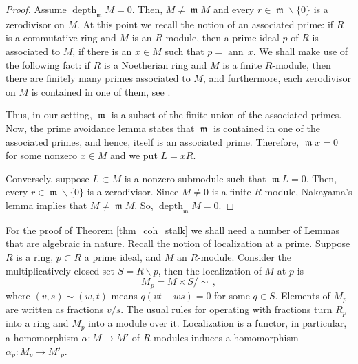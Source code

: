 \documentclass{amsart}
\numberwithin{equation}{section}
\theoremstyle{definition}
\theoremstyle{plain}
\theoremstyle{remark}
\begin{document}
\begin{proof}
Assume ${\mathop{\mathrm{depth}}\nolimits _{{\mathop{\mathfrak{m}}}}} M=0$. Then,  $M\not={{\mathop{\mathfrak{m}}}} M$ and every
 $r\in{{\mathop{\mathfrak{m}}}}\backslash\{0\}$ is a zerodivisor on $M$.
At this point we recall the notion of an associated prime: 
if $R$ is a commutative
ring and $M$ is an $R$-module, then a prime ideal $p$ of $R$ is associated
to $M$, if there is an $x\in M$ such that $p={{\mathop{\mathrm{ann\,}}}} x$.
We shall make use of the following fact:
if $R$ is a Noetherian ring and $M$ is a finite $R$-module, then 
 there are  finitely many primes
associated to $M$, and furthermore, each zerodivisor on $M$ is contained in
one of them, see
\cite[Theorem 3.1]{eisen}.

Thus, in our setting, 
${{\mathop{\mathfrak{m}}}}$ is a subset of the finite union of the associated primes.
Now, the prime avoidance lemma \cite[Theorem 3.3]{eisen} states
that ${{\mathop{\mathfrak{m}}}}$ is contained in one of the associated primes,
and hence, itself 
is an associated prime. Therefore, 
 ${{\mathop{\mathfrak{m}}}} x=0$ for some nonzero $x\in M$ and we  put $L=xR$. 

Conversely, suppose $L\subset M$ is a nonzero submodule such that 
${{\mathop{\mathfrak{m}}}} L=0$. Then, every $r\in {{\mathop{\mathfrak{m}}}}\backslash\{0\}$ is a zerodivisor.
Since $M\not=0$ is a finite $R$-module, Nakayama's lemma 
\cite[Corollary 4.8]{eisen} implies that $M\not={{\mathop{\mathfrak{m}}}} M$.  So,
${\mathop{\mathrm{depth}}\nolimits _{{\mathop{\mathfrak{m}}}}} M=0$.
\end{proof}

For the proof of Theorem \ref{thm_coh_stalk} we shall need 
a number of Lemmas that are algebraic in nature. Recall
the notion of localization at a prime. Suppose $R$ is a ring,
$p\subset R$ a prime ideal, and $M$ an $R$-module.
Consider the multiplicatively closed set $S=R\backslash p$,
then the localization of $M$ at $p$ is
\[
	M_p=M\times S/\sim\, ,
\]
where $(v,s)\sim(w,t)$ means $q(vt-ws)=0$ for some $q\in S$. 
Elements of $M_p$ are written as fractions $v/s$. The usual rules for
operating with fractions turn $R_p$ into a ring and $M_p$ into a module over it.
Localization is a functor, in particular, a homomorphism 
$\alpha:M\rightarrow M'$ of $R$-modules induces a homomorphism 
$\alpha_p:M_p\rightarrow M'_p$.
\end{document}
